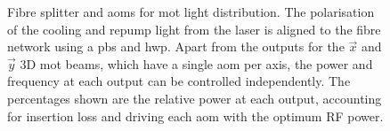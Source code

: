 \begin{figure}[!htbp] 
  \centering 
  \fontsize{18pt}{18pt}
  \resizebox{0.5\textwidth}{!}{}
  \caption[Network of optical fibre splitters and \acp{aom} for
  \ac{mot}light distribution]{Fibre splitter and \acp{aom} for
  \ac{mot} light distribution. The polarisation of the cooling and
repump light from the \Muquans laser is aligned to the fibre network
using a \ac{pbs} and \ac{hwp}. Apart from the outputs for the
\(\vec{x}\) and \(\vec{y}\) 3D \ac{mot} beams, which have a single
\ac{aom} per axis, the power and frequency at each output can be
controlled independently. The percentages shown are the relative power
at each output, accounting for insertion loss and driving each
\ac{aom} with the optimum RF power.} 
\label{fig:fibre_network}
\end{figure} 
